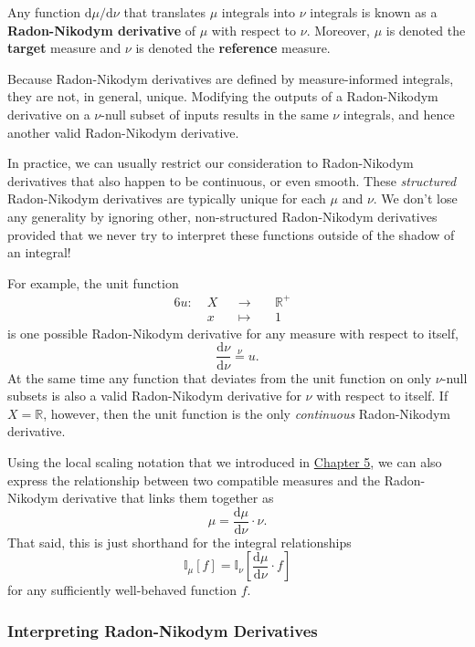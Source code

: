 \documentclass[
  letterpaper,
  DIV=11,
  numbers=noendperiod]{scrartcl}
\begin{document}
Any function \(\mathrm{d} \mu / \mathrm{d} \nu\) that translates \(\mu\)
integrals into \(\nu\) integrals is known as a \textbf{Radon-Nikodym
derivative} of \(\mu\) with respect to \(\nu\). Moreover, \(\mu\) is
denoted the \textbf{target} measure and \(\nu\) is denoted the
\textbf{reference} measure.

Because Radon-Nikodym derivatives are defined by measure-informed
integrals, they are not, in general, unique. Modifying the outputs of a
Radon-Nikodym derivative on a \(\nu\)-null subset of inputs results in
the same \(\nu\) integrals, and hence another valid Radon-Nikodym
derivative.

In practice, we can usually restrict our consideration to Radon-Nikodym
derivatives that also happen to be continuous, or even smooth. These
\emph{structured} Radon-Nikodym derivatives are typically unique for
each \(\mu\) and \(\nu\). We don't lose any generality by ignoring
other, non-structured Radon-Nikodym derivatives provided that we never
try to interpret these functions outside of the shadow of an integral!

For example, the unit function \begin{alignat*}{6}
u :\; & X & &\rightarrow& \; & \mathbb{R}^{+} &
\\
& x & &\mapsto& & 1 &
\end{alignat*} is one possible Radon-Nikodym derivative for any measure
with respect to itself, \[
\frac{ \mathrm{d} \nu }{ \mathrm{d} \nu }
\overset{\nu}{=}
u.
\] At the same time any function that deviates from the unit function on
only \(\nu\)-null subsets is also a valid Radon-Nikodym derivative for
\(\nu\) with respect to itself. If \(X = \mathbb{R}\), however, then the
unit function is the only \emph{continuous} Radon-Nikodym derivative.

Using the local scaling notation that we introduced in
\href{http://www.symplectomorphic.com/assets/chapters_html/expectation_values.html}{Chapter
5}, we can also express the relationship between two compatible measures
and the Radon-Nikodym derivative that links them together as \[
\mu = \frac{ \mathrm{d} \mu }{ \mathrm{d} \nu } \cdot \nu.
\] That said, this is just shorthand for the integral relationships \[
\mathbb{I}_{\mu}[f] =
\mathbb{I}_{\nu} \left[
\frac{ \mathrm{d} \mu }{ \mathrm{d} \nu } \cdot f
\right]
\] for any sufficiently well-behaved function \(f\).

\subsubsection{Interpreting Radon-Nikodym
Derivatives}\label{interpreting-radon-nikodym-derivatives}
\end{document}
